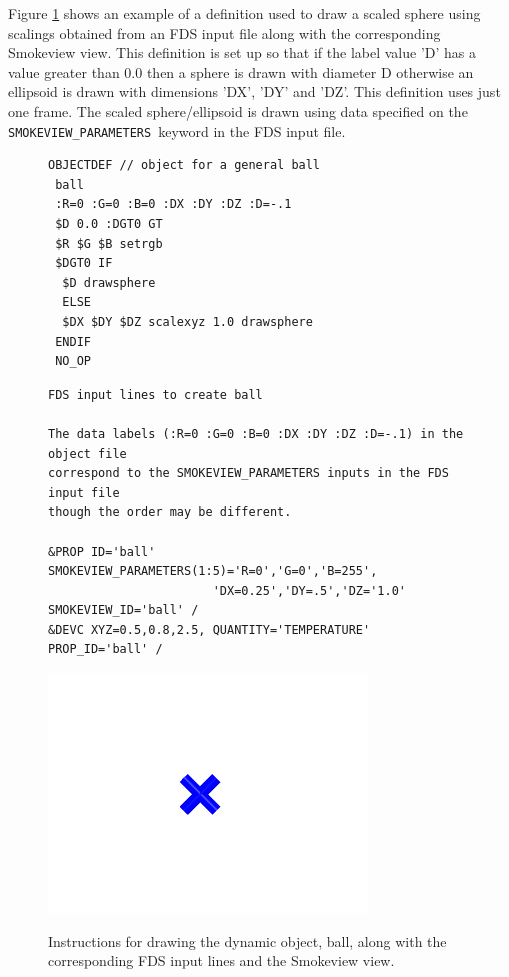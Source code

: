 \documentclass[11pt,twoside]{book}
\newcommand{\figheightA}{2.5in}
\begin{document}
Figure \ref{figball} shows an example of a definition used to draw a
scaled sphere using scalings obtained from an FDS input file along
with the corresponding Smokeview view.  This definition is set up
so that if the label value 'D' has a value greater than 0.0 then a
sphere is drawn with diameter D otherwise an ellipsoid is drawn with
dimensions 'DX', 'DY' and 'DZ'. This definition uses just one frame.
The scaled sphere/ellipsoid is drawn using data specified on the
{\tt SMOKEVIEW\_PARAMETERS}\ keyword in the FDS input file.

\begin{figure}[\figoptions]
{\small
\begin{lstlisting}[frame=single,rulecolor=\color{yellow},
framerule=1pt,framesep=1pc,fillcolor=\color{yellow}]
OBJECTDEF // object for a general ball
 ball
 :R=0 :G=0 :B=0 :DX :DY :DZ :D=-.1
 $D 0.0 :DGT0 GT
 $R $G $B setrgb
 $DGT0 IF
  $D drawsphere
  ELSE
  $DX $DY $DZ scalexyz 1.0 drawsphere
 ENDIF
 NO_OP
\end{lstlisting}
}
{\small
\begin{lstlisting}[frame=single,rulecolor=\color{yellow},
framerule=1pt,framesep=1pc,fillcolor=\color{yellow}]
FDS input lines to create ball

The data labels (:R=0 :G=0 :B=0 :DX :DY :DZ :D=-.1) in the object file
correspond to the SMOKEVIEW_PARAMETERS inputs in the FDS input file
though the order may be different.

&PROP ID='ball' SMOKEVIEW_PARAMETERS(1:5)='R=0','G=0','B=255',
                       'DX=0.25','DY=.5','DZ='1.0' SMOKEVIEW_ID='ball' /
&DEVC XYZ=0.5,0.8,2.5, QUANTITY='TEMPERATURE' PROP_ID='ball' /

\end{lstlisting}
}
\begin{center}
\includegraphics[height=\figheightA]{../FDS_User_Guide/SCRIPT_FIGURES/ball}\\
\end{center}
\caption{Instructions for drawing the dynamic object, ball,
along with the corresponding FDS input lines and the Smokeview view.}
\label{figball}%
\end{figure}
\end{document}
